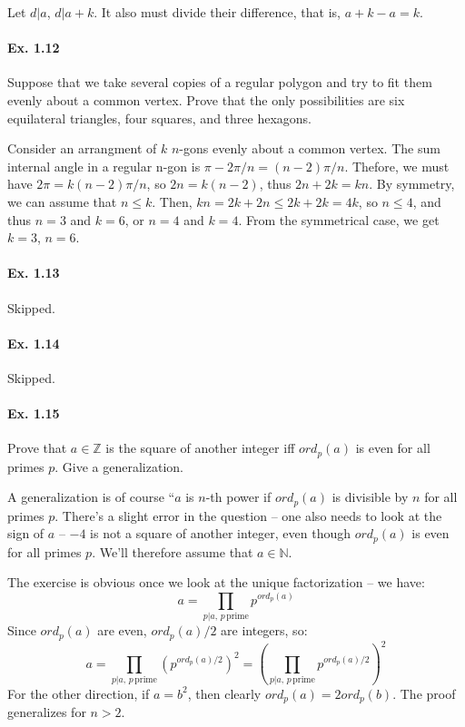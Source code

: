 \documentclass[notitlepage]{article}
\theoremstyle{definition}
\newcommand\Z{\mathbb{Z}}
\newcommand\N{\mathbb{N}}
\begin{document}
Let $d |a$, $d | a+k$. It also must divide their difference, that is, $a+k - a = k$.

\paragraph{Ex. 1.12}

Suppose that we take several copies of a regular polygon and try to fit them evenly
about a common vertex. Prove that the only possibilities are six equilateral triangles,
four squares, and three hexagons.

Consider an arrangment of $k$ $n$-gons evenly about a common
vertex. The sum internal angle in a regular n-gon is $\pi - 2\pi/n =
(n-2)\pi/n$. Thefore, we must have $2\pi = k(n-2)\pi/n$, so $2n =
k(n-2)$, thus $2n + 2k = kn$. By symmetry, we can assume that $n \leq
k$. Then, $kn = 2k + 2n \leq 2k + 2k = 4k$, so $n \leq 4$, and thus $n
= 3$ and $k = 6$, or $n = 4$ and $k = 4$. From the symmetrical case,
we get $k = 3$, $n = 6$.

\paragraph{Ex. 1.13}
Skipped.

\paragraph{Ex. 1.14}
Skipped.

\paragraph{Ex. 1.15}
Prove that $a \in \Z$ is the square of another integer iff
$ord_p(a)$ is even for all primes $p$.  Give a generalization.

A generalization is of course ``$a$ is $n$-th power if $ord_p(a)$ is
divisible by $n$ for all primes $p$. There's a slight error in the
question -- one also needs to look at the sign of $a$ -- $-4$ is not a
square of another integer, even though $ord_p(a)$ is even for all
primes $p$. We'll therefore assume that $a \in \N$.

The exercise is obvious once we look at the unique factorization -- we have:
\begin{equation}
  a = \prod_{p|a,\, p\,\textrm{prime}} p^{ord_p(a)}
\end{equation}
Since $ord_p(a)$ are even, $ord_p(a)/2$ are integers, so:
\begin{equation}
  a = \prod_{p|a,\, p\,\textrm{prime}} (p^{ord_p(a)/2})^2 = \left(\prod_{p|a,\, p\,\textrm{prime}} p^{ord_p(a)/2}\right)^2
\end{equation}
For the other direction, if $a = b^2$, then clearly $ord_p(a) =
2ord_p(b)$. The proof generalizes for $n > 2$.
\end{document}
